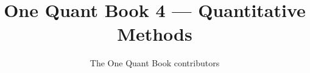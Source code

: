 \documentclass[11pt,a4paper,twoside,openany]{book}
\title{One Quant Book 4 --- Quantitative Methods}
\author{The One Quant Book contributors}
\date{\bookdate}
\begin{document}
\frontmatter



\tableofcontents

\mainmatter


\appendix
\part{\omsolutionspart}


\backmatter
\printindex
\end{document}
